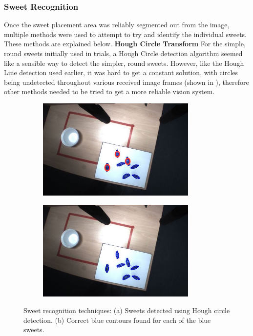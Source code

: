 \subsubsection{Sweet Recognition}
Once the sweet placement area was reliably segmented out from the image, multiple methods were used to attempt to try and identify the individual sweets. These methods are explained below.
\newline\newline
\textbf{Hough Circle Transform}
\newline
For the simple, round sweets initially used in trials, a Hough Circle detection algorithm seemed like a sensible way to detect the simpler, round sweets. However, like the Hough Line detection used earlier, it was hard to get a constant solution, with circles being undetected throughout various received image frames (shown in \textbf{}), therefore other methods needed to be tried to get a more reliable vision system.
\begin{figure}[H]
    \captionsetup[subfigure]{justification=centering}
    \begin{subfigure}[H]{0.475\textwidth}   
        \centering 
        \caption{}
        \includegraphics[width=\textwidth, height=5cm]{sweetcircle.jpg}
        \label{fig:sweetcircle}
    \end{subfigure}
    \begin{subfigure}[H]{0.475\textwidth}   
        \centering 
        \caption{}
        \includegraphics[width=\textwidth, height=5cm]{sweetsfound.jpg}
        \label{fig:workingblue}
    \end{subfigure}
    \vspace{-0.5cm}
    \caption{Sweet recognition techniques: (a) Sweets detected using Hough circle detection. (b) Correct blue contours found for each of the blue sweets.}
\end{figure}
